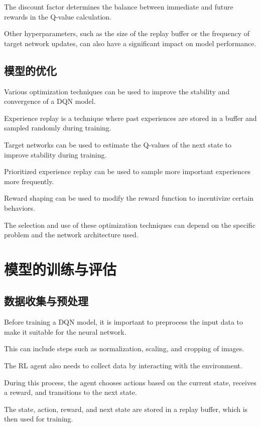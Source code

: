 The discount factor determines the balance between immediate and future rewards in the Q-value calculation.

Other hyperparameters, such as the size of the replay buffer or the frequency of target network updates, can also have a significant impact on model performance.

\subsection{模型的优化}

Various optimization techniques can be used to improve the stability and convergence of a DQN model.

Experience replay is a technique where past experiences are stored in a buffer and sampled randomly during training.

Target networks can be used to estimate the Q-values of the next state to improve stability during training.

Prioritized experience replay can be used to sample more important experiences more frequently.

Reward shaping can be used to modify the reward function to incentivize certain behaviors.

The selection and use of these optimization techniques can depend on the specific problem and the network architecture used.

\section{模型的训练与评估}

\subsection{数据收集与预处理}

Before training a DQN model, it is important to preprocess the input data to make it suitable for the neural network.

This can include steps such as normalization, scaling, and cropping of images.

The RL agent also needs to collect data by interacting with the environment.

During this process, the agent chooses actions based on the current state, receives a reward, and transitions to the next state.

The state, action, reward, and next state are stored in a replay buffer, which is then used for training.


